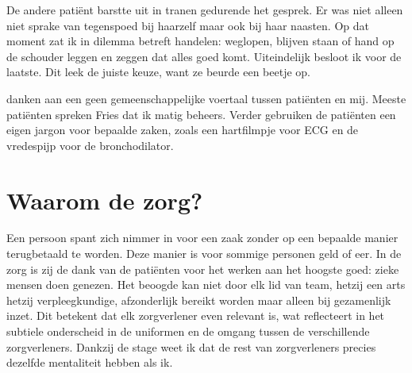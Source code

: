 \documentclass[nohyper,nobib]{tufte-book} %
\begin{document}
    De andere patiënt barstte uit in tranen gedurende het gesprek. Er was niet alleen niet sprake van tegenspoed bij haarzelf maar ook bij haar naasten. Op dat moment zat ik in dilemma betreft handelen: weglopen, blijven staan of hand op de schouder leggen en zeggen dat alles goed komt. Uiteindelijk besloot ik voor de laatste. Dit leek de juiste keuze, want ze beurde een beetje op.

     danken aan een geen gemeenschappelijke voertaal tussen patiënten en mij. Meeste patiënten spreken Fries dat ik matig beheers. Verder gebruiken de patiënten een eigen jargon voor bepaalde zaken, zoals een hartfilmpje voor ECG en de vredespijp voor de bronchodilator.

\chapter{Waarom de zorg?}
Een persoon spant zich nimmer in voor een zaak zonder op een bepaalde manier terugbetaald te worden. Deze manier is voor sommige personen geld of eer. In de zorg is zij de dank van de patiënten voor het werken aan het hoogste goed: zieke mensen doen genezen. Het beoogde kan niet door elk lid van team, hetzij een arts hetzij verpleegkundige, afzonderlijk bereikt worden maar alleen bij gezamenlijk inzet. Dit betekent dat elk zorgverlener even relevant is, wat reflecteert in het subtiele onderscheid in de uniformen en de omgang tussen de verschillende zorgverleners. Dankzij de stage weet ik dat de rest van zorgverleners precies dezelfde mentaliteit hebben als ik. 
\printbibliography
\end{document}
